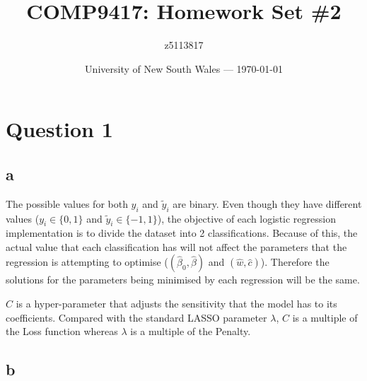\documentclass{article}
\title{COMP9417: Homework Set \#2} %
\author{z5113817} %
\date{University of New South Wales --- \today} %
\begin{document}
\maketitle %


\section*{Question 1}

\subsection*{a} 
The possible values for both \(y_{i}\) and \(\tilde{y}_{i}\) are binary. Even though they have different values
(\(y_{i}\in\{0,1\}\) and \(\tilde{y}_{i}\in\{-1,1\}\)), the objective of each logistic regression implementation 
is to divide the dataset into 2 classifications. Because of this, the actual value that each classification has 
will not affect the parameters that the regression is attempting to optimise (\((\hat{\beta}_{0}, \hat{\beta})\) and
\((\hat{w}, \hat{c})\)). Therefore the solutions for the parameters being minimised by each regression will be the 
same.

\(C\) is a hyper-parameter that adjusts the sensitivity that the model has to its coefficients. Compared with the
standard LASSO parameter \(\lambda\), \(C\) is a multiple of the Loss function whereas \(\lambda\) is a multiple
of the Penalty.

\subsection*{b}
\end{document}
